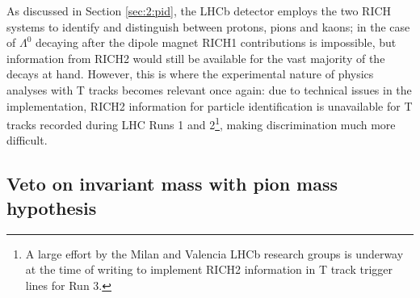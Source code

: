 As discussed in Section \ref{sec:2:pid}, the LHCb detector employs the two RICH systems to identify and distinguish between protons, pions and kaons;
in the case of $\Lambda^0$ decaying after the dipole magnet RICH1 contributions is impossible, but information from RICH2 would still be available for the vast majority of the decays at hand.
However, this is where the experimental nature of physics analyses with T tracks becomes relevant once again:
due to technical issues in the implementation, RICH2 information for particle identification is unavailable for T tracks recorded during LHC Runs 1 and 2\footnote{A large effort by the Milan and Valencia LHCb research groups is underway at the time of writing to implement RICH2 information in T track trigger lines for Run 3.}, making \physbkgshort discrimination much more difficult.

\subsection{Veto on invariant mass with pion mass hypothesis}

